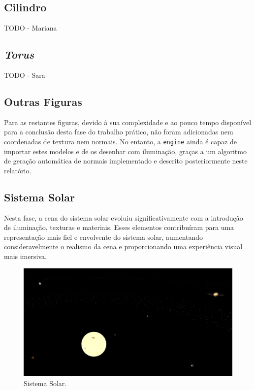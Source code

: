 \documentclass[12pt, a4paper]{article}
\begin{document}
\subsection{Cilindro}

{\color{red} TODO - Mariana}

\subsection{\emph{Torus}}

{\color{red} TODO - Sara}

\subsection{Outras Figuras}

Para as restantes figuras, devido à sua complexidade e ao pouco tempo disponível para a conclusão
desta fase do trabalho prático, não foram adicionadas nem coordenadas de textura nem normais. No
entanto, a \texttt{engine} ainda é capaz de importar estes modelos e de os desenhar com iluminação,
graças a um algoritmo de geração automática de normais implementado e descrito posteriormente neste
relatório.

\subsection{Sistema Solar}

Nesta fase, a cena do sistema solar evoluiu significativamente com a introdução de iluminação,
texturas e materiais. Esses elementos contribuíram para uma representação mais fiel e
envolvente do sistema solar, aumentando consideravelmente o realismo da cena e proporcionando
uma experiência visual mais imersiva.

\begin{figure}[H]
    \centering
    \includegraphics[width=\textwidth]{res/phase4/SolarSystem.png}
    \caption{Sistema Solar.}
\end{figure}
\end{document}
